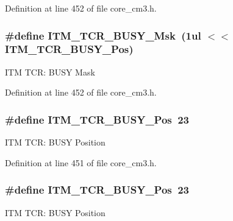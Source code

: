 Definition at line 452 of file core\+\_\+cm3.\+h.

\subsubsection[{\texorpdfstring{I\+T\+M\+\_\+\+T\+C\+R\+\_\+\+B\+U\+S\+Y\+\_\+\+Msk}{ITM_TCR_BUSY_Msk}}]{\setlength{\rightskip}{0pt plus 5cm}\#define I\+T\+M\+\_\+\+T\+C\+R\+\_\+\+B\+U\+S\+Y\+\_\+\+Msk~(1ul $<$$<$ I\+T\+M\+\_\+\+T\+C\+R\+\_\+\+B\+U\+S\+Y\+\_\+\+Pos)}\hypertarget{group___c_m_s_i_s___c_m3___i_t_m_ga43ad7cf33de12f2ef3a412d4f354c60f}{}\label{group___c_m_s_i_s___c_m3___i_t_m_ga43ad7cf33de12f2ef3a412d4f354c60f}
I\+TM T\+CR\+: B\+U\+SY Mask 

Definition at line 452 of file core\+\_\+cm3.\+h.

\subsubsection[{\texorpdfstring{I\+T\+M\+\_\+\+T\+C\+R\+\_\+\+B\+U\+S\+Y\+\_\+\+Pos}{ITM_TCR_BUSY_Pos}}]{\setlength{\rightskip}{0pt plus 5cm}\#define I\+T\+M\+\_\+\+T\+C\+R\+\_\+\+B\+U\+S\+Y\+\_\+\+Pos~23}\hypertarget{group___c_m_s_i_s___c_m3___i_t_m_ga9174ad4a36052c377cef4e6aba2ed484}{}\label{group___c_m_s_i_s___c_m3___i_t_m_ga9174ad4a36052c377cef4e6aba2ed484}
I\+TM T\+CR\+: B\+U\+SY Position 

Definition at line 451 of file core\+\_\+cm3.\+h.

\subsubsection[{\texorpdfstring{I\+T\+M\+\_\+\+T\+C\+R\+\_\+\+B\+U\+S\+Y\+\_\+\+Pos}{ITM_TCR_BUSY_Pos}}]{\setlength{\rightskip}{0pt plus 5cm}\#define I\+T\+M\+\_\+\+T\+C\+R\+\_\+\+B\+U\+S\+Y\+\_\+\+Pos~23}\hypertarget{group___c_m_s_i_s___c_m3___i_t_m_ga9174ad4a36052c377cef4e6aba2ed484}{}\label{group___c_m_s_i_s___c_m3___i_t_m_ga9174ad4a36052c377cef4e6aba2ed484}
I\+TM T\+CR\+: B\+U\+SY Position 

